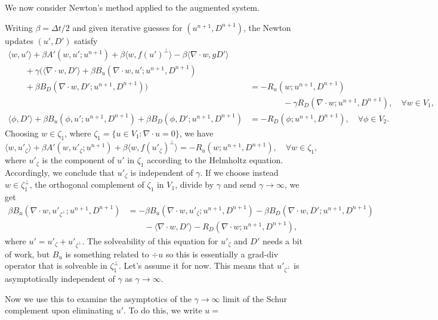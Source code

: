\documentclass{article}
\begin{document}
We now consider Newton's method applied to the augmented system.

Writing $\beta=\Delta t/2$ and given iterative guesses for
$(u^{n+1},D^{n+1})$, the Newton updates $(u',D')$ satisfy
\begin{align}
  \nonumber
  \langle w, u' \rangle + \beta A'(w, u'; u^{n+1})
  + \beta\langle w, f(u')^{\perp}\rangle
  - \beta\langle \nabla\cdot w, gD'\rangle & \\
  \nonumber
  \qquad + \gamma\Big(
  \langle \nabla\cdot w, D' \rangle
  + \beta B_u(\nabla\cdot w, u'; u^{n+1},D^{n+1}) & \\
  \nonumber
  \qquad  + \beta B_D(\nabla\cdot w, D'; u^{n+1},D^{n+1})
  \Big)
  & = -R_u(w;u^{n+1},D^{n+1}) \\
  & \qquad \qquad - \gamma R_D(\nabla\cdot w;
  u^{n+1},D^{n+1}), \quad \forall w \in V_1, \\
  \langle \phi, D' \rangle
  + \beta B_u(\phi, u'; u^{n+1},D^{n+1})
  + \beta B_D(\phi, D'; u^{n+1},D^{n+1})
  & = -R_D(\phi; u^{n+1},D^{n+1}), \quad \forall \phi\in V_2.
\end{align}
Choosing $w \in \zeta_1$, where $\zeta_1=\{u\in V_1:\nabla\cdot u=0\}$,
we have
\begin{equation}
  \langle w, u'_\zeta\rangle + \beta A'(w,u'_\zeta; u^{n+1})
  + \beta\langle w, f(u'_\zeta)^\perp\rangle = -R_u(w; u^{n+1},D^{n+1}),
  \quad \forall w\in \zeta_1,
\end{equation}
where $u'_\zeta$ is the component of $u'$ in $\zeta_1$ according
to the Helmholtz equation. Accordingly, we conclude that $u'_\zeta$
is independent of $\gamma$. If we choose instead $w\in \zeta_1^\perp$,
the orthogonal complement of $\zeta_1$ in $V_1$, divide by $\gamma$
and send $\gamma\to \infty$, we get
\begin{align}
  \nonumber
   \beta B_u(\nabla\cdot w, u'_{\zeta^\perp}; u^{n+1},D^{n+1}) & = 
  -\beta B_u(\nabla\cdot w, u'_\zeta; u^{n+1},D^{n+1}) 
  - \beta B_D(\nabla\cdot w, D'; u^{n+1},D^{n+1}) \\
  & \qquad -\langle \nabla\cdot w, D' \rangle -R_D(\nabla\cdot w;u^{n+1},D^{n+1}),
\end{align}
where $u' = u'_{\zeta} + u'_{\zeta^\perp}$.  The solveability of this
equation for $u'_{\zeta}$ and $D'$ needs a bit of work, but $B_u$ is
something related to $\div u$ so this is essentially a grad-div
operator that is solveable in $\zeta^{\perp}_1$. Let's assume it for
now. This means that $u'_{\zeta^\perp}$ is asymptotically independent
of $\gamma$ as $\gamma\to \infty$.

Now we use this to examine the asymptotics of the $\gamma\to \infty$
limit of the Schur complement upon eliminating $u'$. To do this,
we write $u=$
\end{document}
